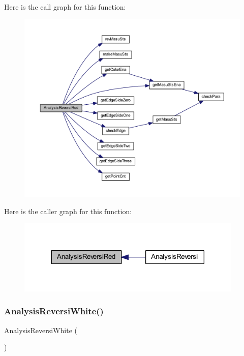 Here is the call graph for this function\+:
\nopagebreak
\begin{figure}[H]
\begin{center}
\leavevmode
\includegraphics[width=350pt]{class_reversi_ad44cfa7c45a98365df2d6db094d61901_cgraph}
\end{center}
\end{figure}
Here is the caller graph for this function\+:
\nopagebreak
\begin{figure}[H]
\begin{center}
\leavevmode
\includegraphics[width=305pt]{class_reversi_ad44cfa7c45a98365df2d6db094d61901_icgraph}
\end{center}
\end{figure}
\mbox{\label{class_reversi_a3c30afb2509b0782b1c22a8770c68c48}} 
\subsubsection{\texorpdfstring{Analysis\+Reversi\+White()}{AnalysisReversiWhite()}}
{\footnotesize\ttfamily Analysis\+Reversi\+White (\begin{DoxyParamCaption}{ }\end{DoxyParamCaption})\hspace{0.3cm}{\ttfamily [private]}}




